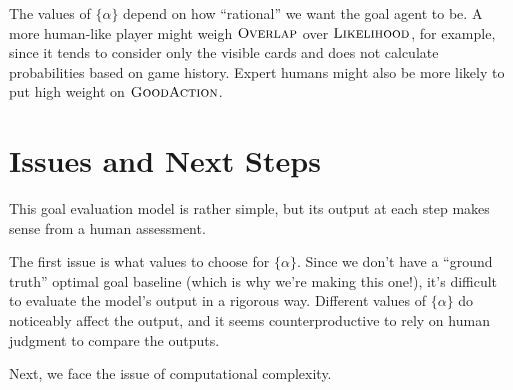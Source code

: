 \documentclass[11pt]{article}
\newcommand{\overlap}{\textsc{Overlap}}
\newcommand{\lkhd}{\textsc{Likelihood}}
\newcommand{\goodaction}{\textsc{GoodAction}}
\begin{document}
The values of $\{\alpha\}$ depend on how ``rational'' we want the goal agent to be. A more human-like player might weigh $\overlap$ over $\lkhd$, for example, since it tends to consider only the visible cards and does not calculate probabilities based on game history. Expert humans might also be more likely to put high weight on $\goodaction$.

\section{Issues and Next Steps}

This goal evaluation model is rather simple, but its output at each step makes sense from a human assessment.

The first issue is what values to choose for $\{\alpha\}$. Since we don't have a ``ground truth'' optimal goal baseline (which is why we're making this one!), it's difficult to evaluate the model's output in a rigorous way. Different values of $\{\alpha\}$ do noticeably affect the output, and it seems counterproductive to rely on human judgment to compare the outputs.

Next, we face the issue of computational complexity.
\end{document}
